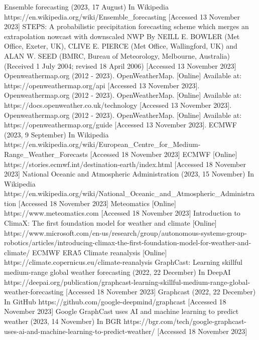 \documentclass[../paper.tex]{subfiles}
\begin{document}
\begin{thebibliography}{00}
     Ensemble forecasting (2023, 17 August) In Wikipedia https://en.wikipedia.org/wiki/Ensemble\_forecasting [Accessed 13 November 2023]
     STEPS:
    A probabilistic precipitation forecasting scheme which merges an extrapolation nowcast with downscaled NWP
    By NEILL E. BOWLER (Met Office, Exeter, UK), CLIVE E. PIERCE (Met Office, Wallingford, UK) and ALAN W. SEED (BMRC,
    Bureau of Meteorology, Melbourne, Australia)
    (Received 1 July 2004; revised 18 April 2006) [Accessed 13 November 2023]
     Openweathermap.org (2012 - 2023).
    OpenWeatherMap.
    [Online] Available at: https://openweathermap.org/api [Accessed 13 November 2023].
     Openweathermap.org (2012 - 2023).
    OpenWeatherMap.
    [Online] Available at: https://docs.openweather.co.uk/technology [Accessed 13 November 2023].
     Openweathermap.org (2012 - 2023).
    OpenWeatherMap.
    [Online] Available at: https://openweathermap.org/guide [Accessed 13 November 2023].
     ECMWF (2023, 9 September) In Wikipedia https://en.wikipedia.org/wiki/European\_Centre\_for\_Medium-Range\_Weather\_Forecasts [Accessed 18 November 2023]
     ECMWF [Online] https://stories.ecmwf.int/destination-earth/index.html [Accessed 18 November 2023]
     National Oceanic and Atmospheric Administration (2023, 15 November) In Wikipedia
    https://en.wikipedia.org/wiki/National\_Oceanic\_and\_Atmospheric\_Administration [Accessed 18 November 2023]
     Meteomatics [Online] https://www.meteomatics.com [Accessed 18 November 2023]
     Introduction to ClimaX: The first foundation model for weather and climate [Online] https://www.microsoft.com/en-us/research/group/autonomous-systems-group-robotics/articles/introducing-climax-the-first-foundation-model-for-weather-and-climate/
     ECMWF ERA5 Climate reanalysis [Online] https://climate.copernicus.eu/climate-reanalysis
     GraphCast: Learning skillful medium-range global weather forecasting (2022, 22 December) In DeepAI https://deepai.org/publication/graphcast-learning-skillful-medium-range-global-weather-forecasting [Accessed 18 November 2023]
     Graphcast (2022, 22 December) In GitHub https://github.com/google-deepmind/graphcast [Accessed 18 November 2023]
     Google GraphCast uses AI and machine learning to predict weather (2023, 14 November) In BGR https://bgr.com/tech/google-graphcast-uses-ai-and-machine-learning-to-predict-weather/ [Accessed 18 November 2023]

\end{thebibliography}
\end{document}
